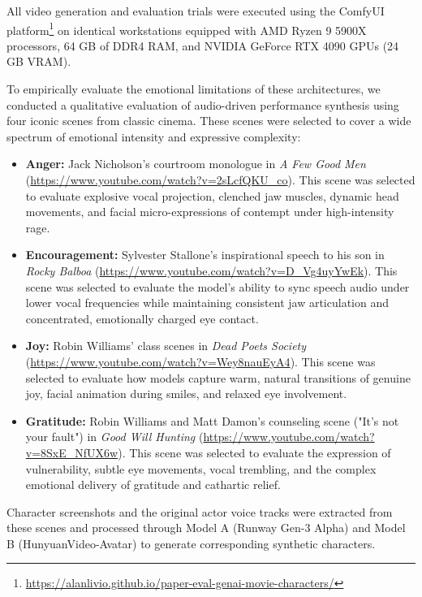 \documentclass[pdflatex,sn-mathphys-num]{sn-jnl}
\newcommand{\emAnger}{Anger\xspace}
\newcommand{\emEncouragement}{Encouragement\xspace}
\newcommand{\emJoy}{Joy\xspace}
\newcommand{\emGratitude}{Gratitude\xspace}
\theoremstyle{thmstyleone}
\theoremstyle{thmstyletwo}
\theoremstyle{thmstylethree}
\begin{document}
All video generation and evaluation trials were executed using the ComfyUI platform\footnote{\url{https://alanlivio.github.io/paper-eval-genai-movie-characters/}} on identical workstations equipped with AMD Ryzen 9 5900X processors, 64 GB of DDR4 RAM, and NVIDIA GeForce RTX 4090 GPUs (24 GB VRAM).

To empirically evaluate the emotional limitations of these architectures, we conducted a qualitative evaluation of audio-driven performance synthesis using four iconic scenes from classic cinema. These scenes were selected to cover a wide spectrum of emotional intensity and expressive complexity:

\begin{itemize}
    \item \textbf{\emAnger:} Jack Nicholson's courtroom monologue in \textit{A Few Good Men} (\url{https://www.youtube.com/watch?v=2sLcfQKU_co}). This scene was selected to evaluate explosive vocal projection, clenched jaw muscles, dynamic head movements, and facial micro-expressions of contempt under high-intensity rage.
    \item \textbf{\emEncouragement:} Sylvester Stallone's inspirational speech to his son in \textit{Rocky Balboa} (\url{https://www.youtube.com/watch?v=D_Vg4uyYwEk}). This scene was selected to evaluate the model's ability to sync speech audio under lower vocal frequencies while maintaining consistent jaw articulation and concentrated, emotionally charged eye contact.
    \item \textbf{\emJoy:} Robin Williams' class scenes in \textit{Dead Poets Society} (\url{https://www.youtube.com/watch?v=Wey8nauEyA4}). This scene was selected to evaluate how models capture warm, natural transitions of genuine joy, facial animation during smiles, and relaxed eye involvement.
    \item \textbf{\emGratitude:} Robin Williams and Matt Damon's counseling scene ("It's not your fault") in \textit{Good Will Hunting} (\url{https://www.youtube.com/watch?v=8SxE_NfUX6w}). This scene was selected to evaluate the expression of vulnerability, subtle eye movements, vocal trembling, and the complex emotional delivery of gratitude and cathartic relief.
\end{itemize}

Character screenshots and the original actor voice tracks were extracted from these scenes and processed through Model A (Runway Gen-3 Alpha) and Model B (HunyuanVideo-Avatar) to generate corresponding synthetic characters.
\end{document}

